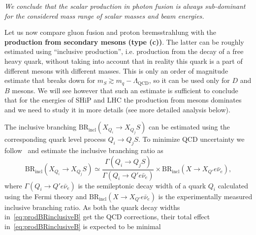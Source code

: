 \documentclass[a4paper,12pt,dvipsnames,usernames]{article}
\begin{document}
\emph{We conclude that the scalar production in photon fusion is always sub-dominant for the considered mass range of scalar masses and beam energies.}

Let us now compare gluon fusion and proton bremsstrahlung with the \textbf{production from secondary mesons (type (c))}.
The latter can be roughly estimated using ``inclusive production'', i.e. production from the decay of a free heavy quark, without taking into account that in reality this quark is a part of different mesons with different masses.  
This is only an order of magnitude estimate that breaks down for $m_S \gtrsim m_q -\Lambda_{\text{QCD}}$, so it can be used only for $D$ and $B$ mesons. We will see however that such an estimate is sufficient to conclude that for the energies of SHiP and LHC the production from mesons dominates and we need to study it in more details (see more detailed analysis below).

The inclusive branching $\text{BR}_{\text{incl}}(X_{Q_{i}} \to X_{Q_{j}}S)$ can be estimated using the corresponding quark level process $Q_{i} \to Q_{j} S$. To minimize QCD uncertainty we follow~\cite{Chivukula:1988gp,Curtin:2018mvb} and estimate the inclusive branching ratio as
\begin{equation}
    \text{BR}_{\text{incl}}(X_{Q_{i}} \to X_{Q_{j}}S) \simeq \frac{\Gamma(Q_{i}\to Q_{j}S )}{\Gamma(Q_{i} \to Q' e\bar{\nu}_{e})}\times\text{BR}_{\text{incl}}(X\to X_{Q'}e\bar{\nu}_{e}),
    \label{eq:prodBRinclusiveB}
\end{equation}
where $\Gamma(Q_{i}\to Q'e\bar{\nu}_{e})$ is the semileptonic decay width of a quark $Q_{i}$ calculated using the Fermi theory and $\text{BR}_{\text{incl}}(X\to X_{Q'}e\bar{\nu}_{e})$ is the experimentally measured inclusive branching ratio. As both the quark decay widths in~\eqref{eq:prodBRinclusiveB} get the QCD corrections, their total effect in~\eqref{eq:prodBRinclusiveB} is expected to be minimal~\cite{Chivukula:1988gp}
\end{document}
